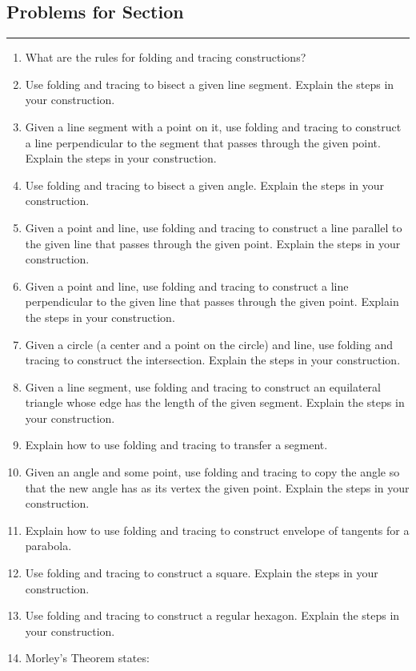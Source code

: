 \subsection*{Problems for Section~\thesection}\hrule\vspace{1ex}
\begin{enumerate}
\item What are the rules for folding and tracing constructions?
\item Use folding and tracing to bisect a given line segment. Explain the steps in
  your construction.
\item Given a line segment with a point on it, use folding and tracing to
  construct a line perpendicular to the segment that passes through
  the given point. Explain the steps in your construction.
\item Use folding and tracing to bisect a given angle. Explain the steps in your
  construction.
\item Given a point and line, use folding and tracing to construct a line parallel
  to the given line that passes through the given point. Explain the
  steps in your construction.
\item Given a point and line, use folding and tracing to construct a line
  perpendicular to the given line that passes through the given
  point. Explain the steps in your construction.
\item Given a circle (a center and a point on the circle) and line,
  use folding and tracing to construct the intersection. Explain the steps in your
  construction.
\item Given a line segment, use folding and tracing to construct an equilateral
  triangle whose edge has the length of the given segment. Explain the
  steps in your construction.
\item Explain how to use folding and tracing to transfer a segment.
\item Given an angle and some point, use folding and tracing to copy the angle so
  that the new angle has as its vertex the given point. Explain the
  steps in your construction.
\item Explain how to use folding and tracing to construct envelope of tangents for
  a parabola.
\item Use folding and tracing to construct a square. Explain the steps in your construction.
\item Use folding and tracing to construct a regular hexagon. Explain the steps in
  your construction.
\item Morley's Theorem states:

\end{enumerate}
